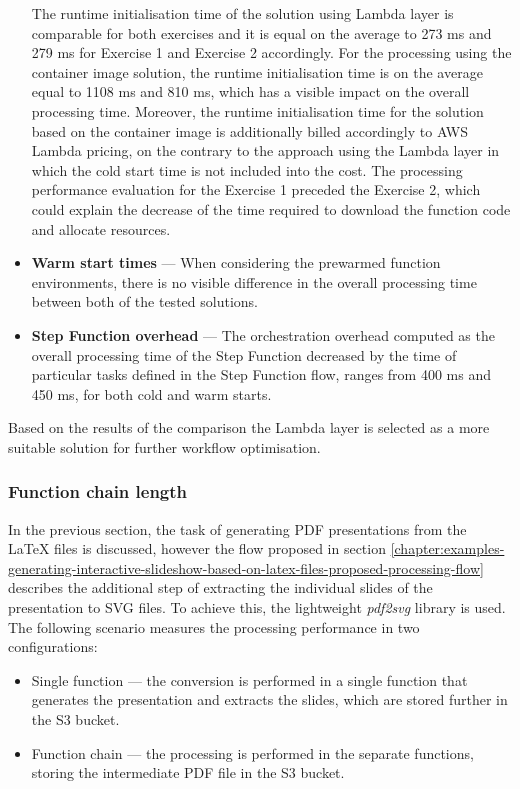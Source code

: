 \begin{itemize}
    The runtime initialisation time of the solution using Lambda layer is comparable for both exercises and it is equal on the average to 273 ms and 279 ms for Exercise 1 and Exercise 2 accordingly. 
    For the processing using the container image solution, the runtime initialisation time is on the average equal to 1108 ms and 810 ms, which has a visible impact on the overall processing time. Moreover, the runtime initialisation time for the solution based on the container image is additionally billed accordingly to AWS Lambda pricing, on the contrary to the approach using the Lambda layer in which the cold start time is not included into the cost.
    The processing performance evaluation for the Exercise 1 preceded the Exercise 2, which could explain the decrease of the time required to download the function code and allocate resources.
    \item \textbf{Warm start times} --- When considering the prewarmed function environments, there is no visible difference in the overall processing time between both of the tested solutions.
    \item \textbf{Step Function overhead} --- The orchestration overhead computed as the overall processing time of the Step Function decreased by the time of particular tasks defined in the Step Function flow, ranges from 400 ms and 450 ms, for both cold and warm starts.    
\end{itemize}

Based on the results of the comparison the Lambda layer is selected as a more suitable solution for further workflow optimisation.

\subsubsection{Function chain length}

In the previous section, the task of generating PDF presentations from the LaTeX files is discussed, however the flow proposed in section \ref{chapter:examples-generating-interactive-slideshow-based-on-latex-files-proposed-processing-flow} describes the additional step of extracting the individual slides of the presentation to SVG files. To achieve this, the lightweight \textit{pdf2svg} \cite{pdf2svg} library is used. The following scenario measures the processing performance in two configurations:

\begin{itemize}
   \item Single function --- the conversion is performed in a single function that generates the presentation and extracts the slides, which are stored further in the S3 bucket.
   \item Function chain --- the processing is performed in the separate functions, storing the intermediate PDF file in the S3 bucket.
\end{itemize}

